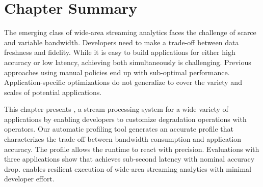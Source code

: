 \section{Chapter Summary}
\label{sec:chapter-summary}

The emerging class of wide-area streaming analytics faces the challenge of
scarce and variable bandwidth. Developers need to make a trade-off between data
freshness and fidelity. While it is easy to build applications for either high
accuracy or low latency, achieving both simultaneously is challenging. Previous
approaches using manual policies end up with sub-optimal
performance. Application-specific optimizations do not generalize to cover the
variety and scales of potential applications.

This chapter presents \sysname{}, a stream processing system for a wide variety
of applications by enabling developers to customize degradation operations with
\maybe{} operators. Our automatic profiling tool generates an accurate profile
that characterizes the trade-off between bandwidth consumption and application
accuracy. The profile allows the runtime to react with precision. Evaluations
with three applications show that \sysname{} achieves sub-second latency with
nominal accuracy drop. \sysname{} enables resilient execution of wide-area
streaming analytics with minimal developer effort.


